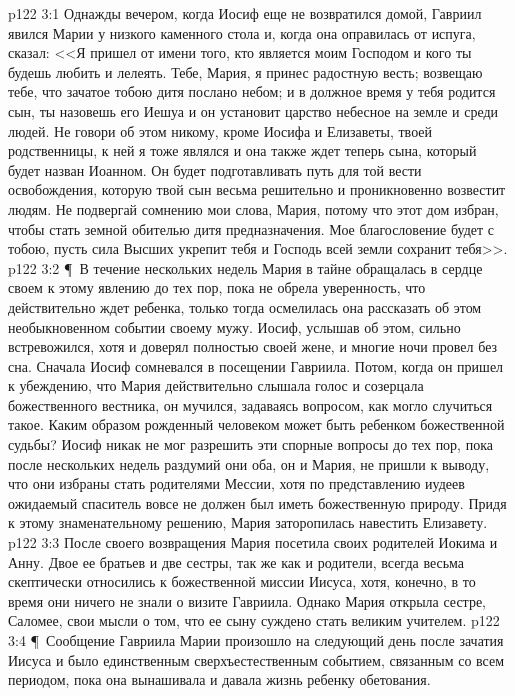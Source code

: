 \vs p122 3:1 Однажды вечером, когда Иосиф еще не возвратился домой, Гавриил явился Марии у низкого каменного стола и, когда она оправилась от испуга, сказал: <<Я пришел от имени того, кто является моим Господом и кого ты будешь любить и лелеять. Тебе, Мария, я принес радостную весть; возвещаю тебе, что зачатое тобою дитя послано небом; и в должное время у тебя родится сын, ты назовешь его Иешуа и он установит царство небесное на земле и среди людей. Не говори об этом никому, кроме Иосифа и Елизаветы, твоей родственницы, к ней я тоже являлся и она также ждет теперь сына, который будет назван Иоанном. Он будет подготавливать путь для той вести освобождения, которую твой сын весьма решительно и проникновенно возвестит людям. Не подвергай сомнению мои слова, Мария, потому что этот дом избран, чтобы стать земной обителью дитя предназначения. Мое благословение будет с тобою, пусть сила Высших укрепит тебя и Господь всей земли сохранит тебя>>.
\vs p122 3:2 \P\ В течение нескольких недель Мария в тайне обращалась в сердце своем к этому явлению до тех пор, пока не обрела уверенность, что действительно ждет ребенка, только тогда осмелилась она рассказать об этом необыкновенном событии своему мужу. Иосиф, услышав об этом, сильно встревожился, хотя и доверял полностью своей жене, и многие ночи провел без сна. Сначала Иосиф сомневался в посещении Гавриила. Потом, когда он пришел к убеждению, что Мария действительно слышала голос и созерцала божественного вестника, он мучился, задаваясь вопросом, как могло случиться такое. Каким образом рожденный человеком может быть ребенком божественной судьбы? Иосиф никак не мог разрешить эти спорные вопросы до тех пор, пока после нескольких недель раздумий они оба, он и Мария, не пришли к выводу, что они избраны стать родителями Мессии, хотя по представлению иудеев ожидаемый спаситель вовсе не должен был иметь божественную природу. Придя к этому знаменательному решению, Мария заторопилась навестить Елизавету.
\vs p122 3:3 После своего возвращения Мария посетила своих родителей Иокима и Анну. Двое ее братьев и две сестры, так же как и родители, всегда весьма скептически относились к божественной миссии Иисуса, хотя, конечно, в то время они ничего не знали о визите Гавриила. Однако Мария открыла сестре, Саломее, свои мысли о том, что ее сыну суждено стать великим учителем.
\vs p122 3:4 \P\ Сообщение Гавриила Марии произошло на следующий день после зачатия Иисуса и было единственным сверхъестественным событием, связанным со всем периодом, пока она вынашивала и давала жизнь ребенку обетования.
